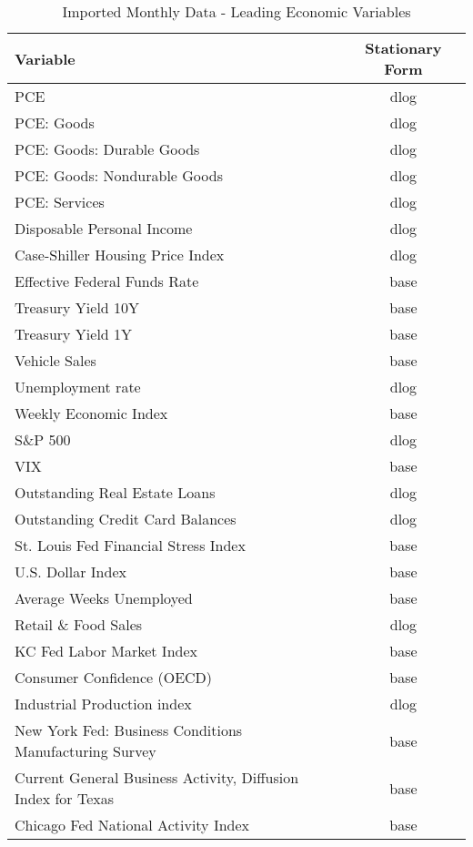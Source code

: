 \documentclass[11pt, letterpaper]{article}\usepackage[]{graphicx}\usepackage[]{color}
\begin{document}
\begin{table}[H]
\centering
\begingroup\scriptsize
\begin{tabular}{lc}
  \hline
Variable & Stationary Form \\ 
  \hline
PCE & dlog \\ 
  PCE: Goods & dlog \\ 
  PCE: Goods: Durable Goods & dlog \\ 
  PCE: Goods: Nondurable Goods & dlog \\ 
  PCE: Services & dlog \\ 
  Disposable Personal Income & dlog \\ 
  Case-Shiller Housing Price Index & dlog \\ 
  Effective Federal Funds Rate & base \\ 
  Treasury Yield 10Y & base \\ 
  Treasury Yield 1Y & base \\ 
  Vehicle Sales & base \\ 
  Unemployment rate & dlog \\ 
  Weekly Economic Index & base \\ 
  S\&P 500 & dlog \\ 
  VIX & base \\ 
  Outstanding Real Estate Loans & dlog \\ 
  Outstanding Credit Card Balances & dlog \\ 
  St. Louis Fed Financial Stress Index & base \\ 
  U.S. Dollar Index & base \\ 
  Average Weeks Unemployed & base \\ 
  Retail \& Food Sales & dlog \\ 
  KC Fed Labor Market Index & base \\ 
  Consumer Confidence (OECD) & base \\ 
  Industrial Production index & dlog \\ 
  New York Fed: Business Conditions Manufacturing Survey & base \\ 
  Current General Business Activity, Diffusion Index for Texas & base \\ 
  Chicago Fed National Activity Index & base \\ 
   \hline
\end{tabular}
\endgroup
\caption{Imported Monthly Data - Leading Economic Variables} 
\end{table}
\end{document}

